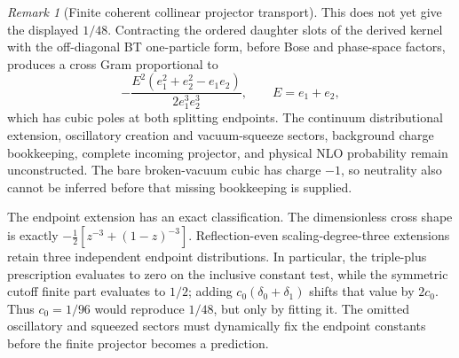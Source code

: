 \documentclass[11pt]{article}
\theoremstyle{definition}
\theoremstyle{remark}
\newtheorem{remark}[theorem]{Remark}
\begin{document}
\begin{remark}[Finite coherent collinear projector transport]
This does not yet give the displayed $1/48$.  Contracting the ordered daughter
slots of the derived kernel with the off-diagonal BT one-particle form, before
Bose and phase-space factors, produces a cross Gram proportional to
\[
 -\frac{E^2(e_1^2+e_2^2-e_1e_2)}{2e_1^3e_2^3},
 \qquad E=e_1+e_2,
\]
which has cubic poles at both splitting endpoints.  The continuum
distributional extension, oscillatory creation and vacuum-squeeze sectors,
background charge bookkeeping, complete incoming projector, and physical NLO
probability remain unconstructed.  The bare broken-vacuum cubic has charge
$-1$, so neutrality also cannot be inferred before that missing bookkeeping
is supplied.

The endpoint extension has an exact classification.  The dimensionless cross
shape is exactly
$-\tfrac12[z^{-3}+(1-z)^{-3}]$.  Reflection-even scaling-degree-three
extensions retain three independent endpoint distributions.  In particular,
the triple-plus prescription evaluates to zero on the inclusive constant test,
while the symmetric cutoff finite part evaluates to $1/2$; adding
$c_0(\delta_0+\delta_1)$ shifts that value by $2c_0$.  Thus $c_0=1/96$ would
reproduce $1/48$, but only by fitting it.  The omitted oscillatory and squeezed
sectors must dynamically fix the endpoint constants before the finite
projector becomes a prediction.


\end{remark}
\end{document}
